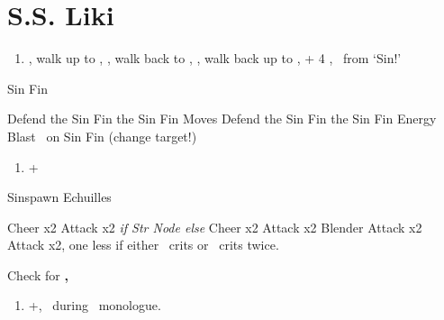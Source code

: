 \chapter{S.S. Liki}

\begin{enumerate}
	\item \cs[2:00], walk up to \yuna, \sd, walk back to \wakka, \sd, walk back up to \yuna, \cs + 4 \skippablefmv, \sd\ from `Sin!'
\end{enumerate}
\begin{battle}[2000]{Sin Fin}
	\begin{itemize}
		\tidusf Defend
		\switch{\yuna}{\lulu}
		\luluf \thunder{} the Sin Fin
		\kimahrif \lancet{} the Sin Fin
		\enemyf Moves
		\tidusf Defend
		\kimahrif \lancet{} the Sin Fin
		\luluf \thunder{} the Sin Fin
		\switch{\tidus}{\yuna}
		\summon{\valefor}
		\valeforf Energy Blast \od\ on Sin Fin (change target!)
	\end{itemize}
\end{battle}
\begin{enumerate}[resume]
	\item \fmv+\cs[1:40]
\end{enumerate}
\begin{battle}[2000]{Sinspawn Echuilles}
	\begin{itemize}
		\tidusf Cheer x2
		\wakkaf \darkattack{}
		\tidusf Attack x2 \textit{if Str Node else} Cheer x2
		\wakkaf Attack x2
		\enemyf Blender
		\wakkaf Attack x2
		\tidusf Attack x2, one less if either \tidus\ crits or \wakka\ crits twice.
		\tidusf \od
	\end{itemize}
	Check for \textbf{\icebrand{}, \iceball{}}
\end{battle}
\begin{enumerate}[resume]
	\item \skippablefmv+\cs[1:30], \sd\ during \tidus\ monologue.
\end{enumerate}